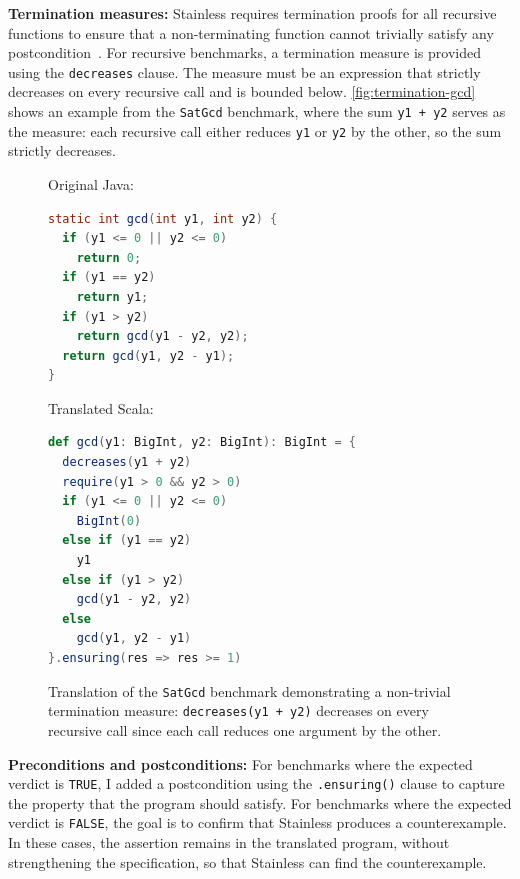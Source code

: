 \documentclass[11pt,titlepage,openright]{book}
\begin{document}
 
\textbf{Termination measures:}
Stainless requires termination proofs for all recursive functions to
ensure that a non-terminating function cannot trivially satisfy any
postcondition~\cite{StainlessOriginal}. For recursive benchmarks,
a termination measure is provided using the \texttt{decreases} clause.
The measure must be an expression that strictly decreases on every
recursive call and is bounded below. \autoref{fig:termination-gcd} shows
an example from the \texttt{SatGcd} benchmark, where the sum \texttt{y1 + y2}
serves as the measure: each recursive call either reduces \texttt{y1} or
\texttt{y2} by the other, so the sum strictly decreases.

\begin{figure}[htbp]
\begin{minipage}[t]{0.4\textwidth}
Original Java:
\begin{lstlisting}[language=Java, basicstyle=\ttfamily\scriptsize]
static int gcd(int y1, int y2) {
  if (y1 <= 0 || y2 <= 0)
    return 0;
  if (y1 == y2)
    return y1;
  if (y1 > y2)
    return gcd(y1 - y2, y2);
  return gcd(y1, y2 - y1);
}
\end{lstlisting}
\end{minipage}
\hfill
\begin{minipage}[t]{0.48\textwidth}
Translated Scala:
\begin{lstlisting}[language=Scala, basicstyle=\ttfamily\scriptsize]
def gcd(y1: BigInt, y2: BigInt): BigInt = {
  decreases(y1 + y2)
  require(y1 > 0 && y2 > 0)
  if (y1 <= 0 || y2 <= 0)
    BigInt(0)
  else if (y1 == y2)
    y1
  else if (y1 > y2)
    gcd(y1 - y2, y2)
  else
    gcd(y1, y2 - y1)
}.ensuring(res => res >= 1)
\end{lstlisting}
\end{minipage}
\caption{Translation of the \texttt{SatGcd} benchmark demonstrating a
non-trivial termination measure: \texttt{decreases(y1 + y2)} decreases
on every recursive call since each call reduces one argument by the other.}
\label{fig:termination-gcd}
\end{figure}
 
\textbf{Preconditions and postconditions:}
For benchmarks where the expected verdict is \texttt{TRUE}, I added a
postcondition using the \texttt{.ensuring()} clause to capture the
property that the program should satisfy. For benchmarks where the
expected verdict is \texttt{FALSE}, the goal is to confirm that Stainless
produces a counterexample. In these cases, the assertion remains in the 
translated program, without strengthening the specification, so that Stainless
can find the counterexample.
 
\end{document}
